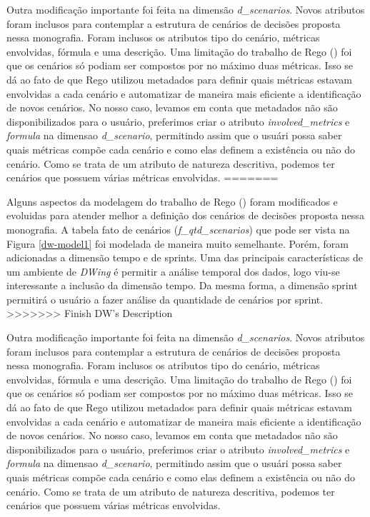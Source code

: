 Outra modificação importante foi feita na dimensão \emph{d\_scenarios}. Novos atributos foram inclusos para contemplar a estrutura de cenários de decisões proposta nessa monografia. Foram inclusos os atributos tipo do cenário, métricas envolvidas, fórmula e uma descrição. Uma limitação do trabalho de Rego (\citeyear{rego2014}) foi que os cenários só podiam ser compostos por no máximo duas métricas. Isso se dá ao fato de que Rego utilizou  metadados para definir quais métricas estavam envolvidas a cada cenário e automatizar de maneira mais eficiente a identificação de novos cenários. No nosso caso, levamos em conta que  metadados não são disponibilizados para o usuário, preferimos criar o atributo \emph{involved\_metrics} e \emph{formula} na dimensao \emph{d\_scenario}, permitindo assim que o usuári possa saber quais métricas compõe cada cenário e como elas definem a existência ou não do cenário. Como se trata de um atributo de natureza descritiva, podemos ter cenários que possuem várias métricas envolvidas.
=======

Alguns aspectos da modelagem do trabalho de Rego (\citeyear{rego2014}) foram modificados e evoluidas para atender melhor a definição dos cenários de decisões proposta nessa monografia. A tabela fato de cenários (\emph{f\_qtd\_scenarios}) que pode ser vista na Figura \ref{dw-model1}  foi modelada de maneira muito semelhante. Porém, foram adicionadas a dimensão tempo e de sprints. Uma das principais características de um ambiente de \emph{DWing} é permitir a análise temporal dos dados, logo viu-se interessante a inclusão da dimensão tempo. Da mesma forma, a dimensão sprint permitirá o usuário a fazer análise da quantidade de cenários por sprint. 
>>>>>>> Finish DW's Description

Outra modificação importante foi feita na dimensão \emph{d\_scenarios}. Novos atributos foram inclusos para contemplar a estrutura de cenários de decisões proposta nessa monografia. Foram inclusos os atributos tipo do cenário, métricas envolvidas, fórmula e uma descrição. Uma limitação do trabalho de Rego (\citeyear{rego2014}) foi que os cenários só podiam ser compostos por no máximo duas métricas. Isso se dá ao fato de que Rego utilizou  metadados para definir quais métricas estavam envolvidas a cada cenário e automatizar de maneira mais eficiente a identificação de novos cenários. No nosso caso, levamos em conta que  metadados não são disponibilizados para o usuário, preferimos criar o atributo \emph{involved\_metrics} e \emph{formula} na dimensao \emph{d\_scenario}, permitindo assim que o usuári possa saber quais métricas compõe cada cenário e como elas definem a existência ou não do cenário. Como se trata de um atributo de natureza descritiva, podemos ter cenários que possuem várias métricas envolvidas.

